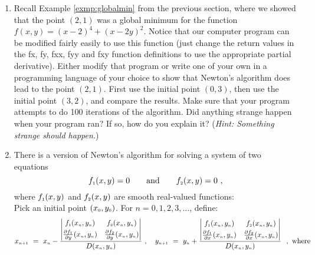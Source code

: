 \begin{enumerate}[\bfseries 1.]
 \item Recall Example \ref{exmp:globalmin} from the previous section, where we showed that the point $(2,1)$ was a global minimum for the function $f(x,y) = (x-2)^4 + (x-2y)^2$. 
 Notice that our computer program can be modified fairly easily to use this function (just change the return values in the fx, fy, fxx, fyy and fxy
  function definitions to use the appropriate
  partial derivative). Either modify that program or write one of your own in a programming language of your
  choice to show that Newton's algorithm does lead to the point $(2,1)$. First use the initial point $(0,3)$, then use
  the initial point $(3,2)$, and compare the results. Make sure that your program attempts to do 100 iterations of the
  algorithm. Did anything strange happen when your program ran? If so, how do you explain it? (\emph{Hint: Something
  strange should happen.})
 \item There is a version of Newton's algorithm for solving a system of two equations
  \begin{displaymath}
   f_{\scriptscriptstyle 1}(x,y) = 0 \qquad\text{and}\qquad f_{\scriptscriptstyle 2}(x,y) = 0 ~,
  \end{displaymath}
  where $f_{\scriptscriptstyle 1}(x,y)$ and $f_{\scriptscriptstyle 2}(x,y)$ are smooth real-valued functions:\\
  Pick an initial point $(x_{\scriptscriptstyle 0},y_{\scriptscriptstyle 0})$. For $n = 0, 1, 2, 3, \dots$, define:
  \begin{gather*}
   \ssub{x}{n+1} ~=~ \ssub{x}{n} -
   \frac{
    \begin{vmatrix}
     \ssub{f}{1}(\ssub{x}{n},\ssub{y}{n}) &
     \ssub{f}{2}(\ssub{x}{n},\ssub{y}{n})\vspace{1mm}\\
     \frac{\partial \ssub{f}{1}}{\partial y}(\ssub{x}{n},\ssub{y}{n}) &
     \frac{\partial \ssub{f}{2}}{\partial y}(\ssub{x}{n},\ssub{y}{n})
    \end{vmatrix}}{D(\ssub{x}{n},\ssub{y}{n})} ~,\quad
   \ssub{y}{n+1} ~=~ \ssub{y}{n} +
   \frac{
    \begin{vmatrix}
     \ssub{f}{1}(\ssub{x}{n},\ssub{y}{n}) &
     \ssub{f}{2}(\ssub{x}{n},\ssub{y}{n})\vspace{1mm}\\
     \frac{\partial \ssub{f}{1}}{\partial x}(\ssub{x}{n},\ssub{y}{n}) &
     \frac{\partial \ssub{f}{2}}{\partial x}(\ssub{x}{n},\ssub{y}{n})
    \end{vmatrix}}{D(\ssub{x}{n},\ssub{y}{n})} ~~,~\text{where}\\[6pt]

\end{gather*}
\end{enumerate}

